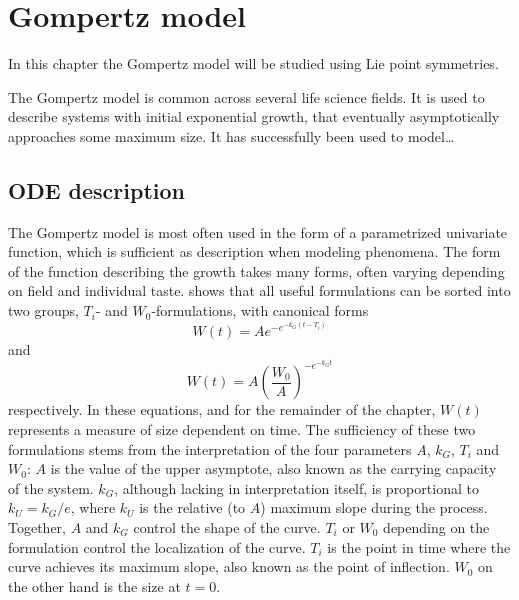 \chapter{Gompertz model}

In this chapter the Gompertz model will be studied using Lie point symmetries.

The Gompertz model is common across several life science fields.
It is used to describe systems with initial exponential growth, that eventually asymptotically approaches some maximum size.
It has successfully been used to model\dots

\section{ODE description}

The Gompertz model is most often used in the form of a parametrized univariate function, which is sufficient as description when modeling phenomena.
The form of the function describing the growth takes many forms, often varying depending on field and individual taste.
\cite{tjorve2017gompertz} shows that all useful formulations can be sorted into two groups, \(T_i\)- and \(W_0\)-formulations, with canonical forms
\begin{equation} \label{eq:gompertz-ti-function}
  W(t) = A e^{-e^{-k_G(t-T_i)}}
\end{equation}
and
\begin{equation} \label{eq:gompertz-w0-function}
  W(t) = A \left(\frac{W_0}{A}\right)^{-e^{-k_G t}}
\end{equation}
respectively.
In these equations, and for the remainder of the chapter, \(W(t)\) represents a measure of size dependent on time.
The sufficiency of these two formulations stems from the interpretation of the four parameters \(A\), \(k_G\), \(T_i\) and \(W_0\):
\(A\) is the value of the upper asymptote, also known as the carrying capacity of the system.
\(k_G\), although lacking in interpretation itself, is proportional to \(k_U = k_G / e\), where \(k_U\) is the relative (to \(A\)) maximum slope during the process.
Together, \(A\) and \(k_G\) control the shape of the curve.
\(T_i\) or \(W_0\) depending on the formulation control the localization of the curve.
\(T_i\) is the point in time where the curve achieves its maximum slope, also known as the point of inflection.
\(W_0\) on the other hand is the size at \(t=0\).


